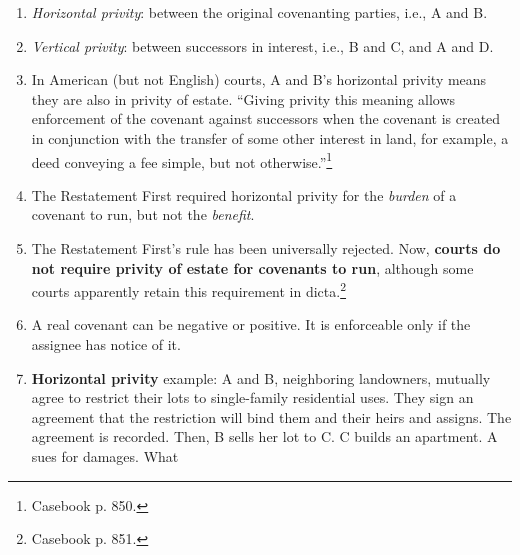 \begin{enumerate}
    D?\footnote{Casebook p. 849.}
    \begin{enumerate}
        \item If A sued B, the covenant will be enforced because A and B are 
        in privity of contract.
        \item B holds the servient tenement and bears the \emph{burden} of the 
        covenant. Upon sale, the burden runs to C.
        \item A holds the dominant tenement and bears the \emph{benefit} end 
        of the covenant. Upon sale, the benefit runs to D.
        \item ``~.~.~.~the test for the running of the burden is traditionally 
        more onerous than the test for running of the 
        benefit.''\footnote{Casebook p. 849.}
    \end{enumerate}
    \item \emph{Horizontal privity}: between the original covenanting 
    parties, i.e., A and B.
    \item \emph{Vertical privity}: between successors in interest, i.e., B 
    and C, and A and D.
    \item In American (but not English) courts, A and B's horizontal privity 
    means they are also in privity of estate. ``Giving privity this meaning 
    allows enforcement of the covenant against successors when the covenant is 
    created in conjunction with the transfer of some other interest in land, 
    for example, a deed conveying a fee simple, but not 
    otherwise.''\footnote{Casebook p. 850.}
    \item The Restatement First required horizontal privity for the 
    \emph{burden} of a covenant to run, but not the \emph{benefit}.
    \item The Restatement First's rule has been universally rejected. Now, 
    \textbf{courts do not require privity of estate for covenants to run}, 
    although some courts apparently retain this requirement in 
    dicta.\footnote{Casebook p. 851.}
    \item A real covenant can be negative or positive. It is enforceable only 
    if the assignee has notice of it.
    \item \textbf{Horizontal privity} example: A and B, neighboring 
    landowners, mutually agree to restrict their lots to single-family 
    residential uses. They sign an agreement that the restriction will bind 
    them and their heirs and assigns. The agreement is recorded. Then, B sells 
    her lot to C. C builds an apartment. A sues for damages. What 

\end{enumerate}
